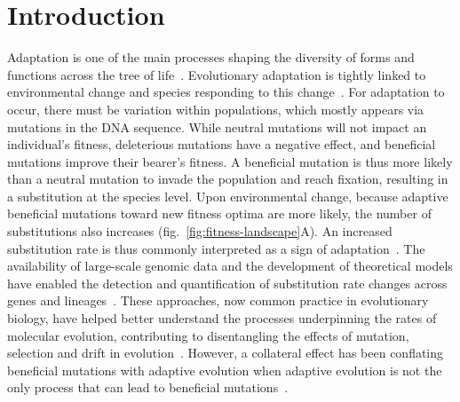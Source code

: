 \documentclass{article}
\begin{document}
    \section*{Introduction}
    Adaptation is one of the main processes shaping the diversity of forms and functions across the tree of life~\cite{darwin_origin_1859}.
    Evolutionary adaptation is tightly linked to environmental change and species responding to this change~\cite{merrell_adaptive_1994, gavrilets_adaptive_2009}.
    For adaptation to occur, there must be variation within populations, which mostly appears via mutations in the DNA sequence.
    While neutral mutations will not impact an individual's fitness, deleterious mutations have a negative effect, and beneficial mutations improve their bearer's fitness.
    A beneficial mutation is thus more likely than a neutral mutation to invade the population and reach fixation, resulting in a substitution at the species level.
    Upon environmental change, because adaptive beneficial mutations toward new fitness optima are more likely, the number of substitutions also increases (fig.~\ref{fig:fitness-landscape}A).
    An increased substitution rate is thus commonly interpreted as a sign of adaptation~\cite{mcdonald_adaptative_1991, smith_adaptive_2002, welch_estimating_2006}.
    The availability of large-scale genomic data and the development of theoretical models have enabled the detection and quantification of substitution rate changes across genes and lineages~\cite{yang_statistical_2000, eyre-walker_genomic_2006, moutinho_variation_2019}.
    These approaches, now common practice in evolutionary biology, have helped better understand the processes underpinning the rates of molecular evolution, contributing to disentangling the effects of mutation, selection and drift in evolution~\cite{lynch_mutation_2023}.
    However, a collateral effect has been conflating beneficial mutations with adaptive evolution when adaptive evolution is not the only process that can lead to beneficial mutations~\cite{charlesworth_other_2007, mustonen_fitness_2009}.
\end{document}
